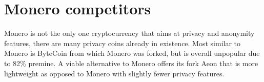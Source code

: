 \documentclass[
  printed, %
  table,   %
  nolof,     %
  nolot,     %
           oneside, color
]{fithesis3}
\begin{document}
\section{Monero competitors}
Monero is not the only one cryptocurrency that aims at privacy and anonymity features, there are many privacy coins already in existence. Most similar to Monero is ByteCoin from which Monero was forked, but is overall unpopular due to 82\% premine.  A viable alternative to Monero offers its fork Aeon that is more lightweight as opposed to Monero with slightly fewer privacy features.
\end{document}
